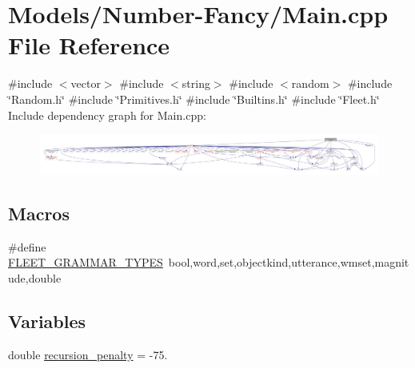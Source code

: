 \hypertarget{_number-_fancy_2_main_8cpp}{}\section{Models/\+Number-\/\+Fancy/\+Main.cpp File Reference}
\label{_number-_fancy_2_main_8cpp}
{\ttfamily \#include $<$vector$>$}\newline
{\ttfamily \#include $<$string$>$}\newline
{\ttfamily \#include $<$random$>$}\newline
{\ttfamily \#include \char`\"{}Random.\+h\char`\"{}}\newline
{\ttfamily \#include \char`\"{}Primitives.\+h\char`\"{}}\newline
{\ttfamily \#include \char`\"{}Builtins.\+h\char`\"{}}\newline
{\ttfamily \#include \char`\"{}Fleet.\+h\char`\"{}}\newline
Include dependency graph for Main.\+cpp\+:
\nopagebreak
\begin{figure}[H]
\begin{center}
\leavevmode
\includegraphics[width=350pt]{_number-_fancy_2_main_8cpp__incl}
\end{center}
\end{figure}
\subsection*{Macros}
\begin{DoxyCompactItemize}
\item 
\#define \hyperlink{_number-_fancy_2_main_8cpp_a89fb8e7826ca09e23da0ce4b39ee03c0}{F\+L\+E\+E\+T\+\_\+\+G\+R\+A\+M\+M\+A\+R\+\_\+\+T\+Y\+P\+ES}~bool,word,set,objectkind,utterance,wmset,magnitude,double
\end{DoxyCompactItemize}
\subsection*{Variables}
\begin{DoxyCompactItemize}
\item 
double \hyperlink{_number-_fancy_2_main_8cpp_a2b89a3942775c189ae481ab8af21076e}{recursion\+\_\+penalty} = -\/75.
\end{DoxyCompactItemize}


